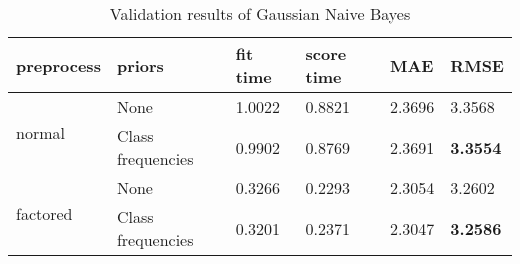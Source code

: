 \begin{table}[H]
    \centering
    \begin{tabular}{ll|llll}
    \toprule
    \textbf{preprocess} & \textbf{priors} & \textbf{fit time} & \textbf{score time} & \textbf{MAE} & \textbf{RMSE} \\ \midrule
    \multirow{2}{*}{normal}   & None              & 1.0022 & 0.8821 & 2.3696 & 3.3568 \\
                              & Class frequencies & 0.9902 & 0.8769 & 2.3691 & \textbf{3.3554} \\
                              \midrule
    \multirow{2}{*}{factored} & None              & 0.3266 & 0.2293 & 2.3054 & 3.2602 \\
                              & Class frequencies & 0.3201 & 0.2371 & 2.3047 & \textbf{3.2586} \\
    \bottomrule
    \end{tabular}
    \caption{Validation results of Gaussian Naive Bayes}
    \label{tab:val_nb}
    \end{table}